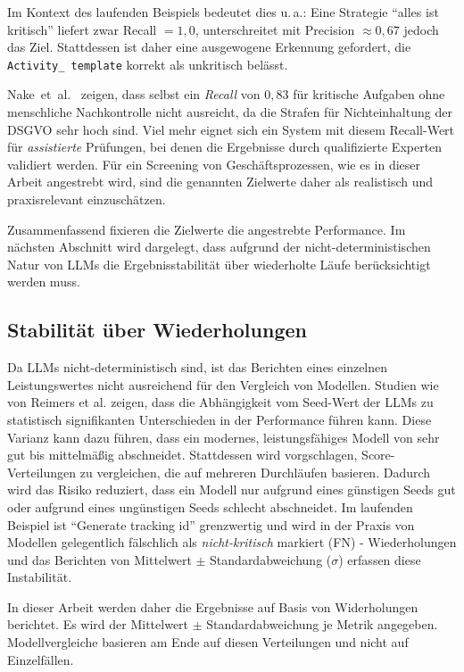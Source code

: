 Im Kontext des laufenden Beispiels bedeutet dies u.\,a.: Eine Strategie \enquote{alles ist kritisch} liefert zwar Recall $=1{,}0$, unterschreitet mit Precision $\approx 0{,}67$ jedoch das Ziel. Stattdessen ist daher eine ausgewogene Erkennung gefordert, die \texttt{Activity\_\linebreak~template} korrekt als unkritisch belässt.

Nake~et~al.\ \cite{nake2023towards} zeigen, dass selbst ein \emph{Recall} von $0{,}83$ für kritische Aufgaben ohne menschliche Nachkontrolle nicht ausreicht, da die Strafen für Nichteinhaltung der \ac{DSGVO} sehr hoch sind. Viel mehr eignet sich ein System mit diesem Recall-Wert für \emph{assistierte} Prüfungen, bei denen die Ergebnisse durch qualifizierte Experten validiert werden. Für ein Screening von Geschäftsprozessen, wie es in dieser Arbeit angestrebt wird, sind die genannten Zielwerte daher als realistisch und praxisrelevant einzuschätzen.

Zusammenfassend fixieren die Zielwerte die angestrebte Performance. Im nächsten Abschnitt wird dargelegt, dass aufgrund der nicht-deterministischen Natur von \acp{LLM} die Ergebnisstabilität über wiederholte Läufe berücksichtigt werden muss.

\subsection*{Stabilität über Wiederholungen}

Da \acp{LLM} nicht-deterministisch sind, ist das Berichten eines einzelnen Leistungswertes nicht ausreichend für den Vergleich von Modellen. Studien wie von Reimers et al. \cite{reimers2017reporting} zeigen, dass die Abhängigkeit vom Seed-Wert der \acp{LLM} zu statistisch signifikanten Unterschieden in der Performance führen kann. Diese Varianz kann dazu führen, dass ein modernes, leistungsfähiges Modell von sehr gut bis mittelmäßig abschneidet. Stattdessen wird vorgschlagen, Score-Verteilungen zu vergleichen, die auf mehreren Durchläufen basieren. Dadurch wird das Risiko reduziert, dass ein Modell nur aufgrund eines günstigen Seeds gut oder aufgrund eines ungünstigen Seeds schlecht abschneidet. Im laufenden Beispiel ist \enquote{Generate tracking id} grenzwertig und wird in der Praxis von Modellen gelegentlich fälschlich als \emph{nicht-kritisch} markiert (\ac{FN}) - Wiederholungen und das Berichten von Mittelwert $\pm$ Standardabweichung ($\sigma$) erfassen diese Instabilität.

In dieser Arbeit werden daher die Ergebnisse auf Basis von Widerholungen berichtet. Es wird der Mittelwert $\pm$ Standardabweichung je Metrik angegeben. Modellvergleiche basieren am Ende auf diesen Verteilungen und nicht auf Einzelfällen.